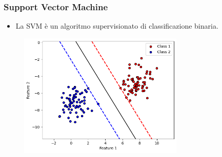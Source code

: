 \documentclass{beamer}
\begin{document}
\begin{frame}
  \frametitle{Support Vector Machine}
    \begin{itemize}
      \item La SVM è un algoritmo supervisionato di classificazione binaria.
    \end{itemize}
      \begin{figure}
            \includegraphics[width=0.7\textwidth]{images/classicalsvm.png}
       \end{figure}
  \end{frame}
\end{document}
